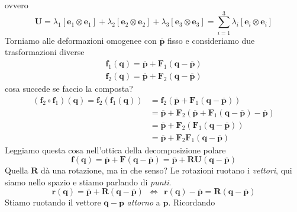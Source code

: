 \documentclass[10pt,a4paper,twoside]{book}
\begin{document}
ovvero
\begin{equation*}
\mathbf{U} =\lambda _{1}[\mathbf{e}_{1} \otimes \mathbf{e}_{1}] +\lambda _{2}[\mathbf{e}_{2} \otimes \mathbf{e}_{2}] +\lambda _{3}[\mathbf{e}_{3} \otimes \mathbf{e}_{3}] =\sum\limits ^{3}_{i=1} \lambda _{i}[\mathbf{e}_{i} \otimes \mathbf{e}_{i}]
\end{equation*}
Torniamo alle deformazioni omogenee con $\overline{\mathbf{p}}$ fisso e consideriamo due trasformazioni diverse
\begin{gather*}
\mathbf{f}_{1}(\mathbf{q}) =\overline{\mathbf{p}} +\mathbf{F}_{1}(\mathbf{q} -\overline{\mathbf{p}})\\
\mathbf{f}_{2}(\mathbf{q}) =\overline{\mathbf{p}} +\mathbf{F}_{2}(\mathbf{q} -\overline{\mathbf{p}})
\end{gather*}
cosa succede se faccio la composta?
\begin{equation*}
\begin{aligned}
(\mathbf{f}_{2} \circ \mathbf{f}_{1})(\mathbf{q}) =\mathbf{f}_{2}(\mathbf{f}_{1}(\mathbf{q})) & =\mathbf{f}_{2}(\overline{\mathbf{p}} +\mathbf{F}_{1}(\mathbf{q} -\overline{\mathbf{p}}))\\
 & =\overline{\mathbf{p}} +\mathbf{F}_{2}(\overline{\mathbf{p}} +\mathbf{F}_{1}(\mathbf{q} -\overline{\mathbf{p}}) -\overline{\mathbf{p}})\\
 & =\overline{\mathbf{p}} +\mathbf{F}_{2}(\mathbf{F}_{1}(\mathbf{q} -\overline{\mathbf{p}}))\\
 & =\overline{\mathbf{p}} +\mathbf{F}_{2}\mathbf{F}_{1}(\mathbf{q} -\overline{\mathbf{p}})
\end{aligned}
\end{equation*}
Leggiamo questa cosa nell'ottica della decomposizione polare
\begin{equation*}
\mathbf{f}(\mathbf{q}) =\overline{\mathbf{p}} +\mathbf{F}(\mathbf{q} -\overline{\mathbf{p}}) =\overline{\mathbf{p}} +\mathbf{RU}(\mathbf{q} -\overline{\mathbf{p}})
\end{equation*}
Quella $\mathbf{R}$ dà una rotazione, ma in che senso? Le rotazioni ruotano i \textit{vettori}, qui siamo nello spazio e stiamo parlando di \textit{punti}.
\begin{equation*}
\mathbf{r}(\mathbf{q}) =\overline{\mathbf{p}} +\mathbf{R}(\mathbf{q} -\overline{\mathbf{p}}) \ \ \Leftrightarrow \ \ \mathbf{r}(\mathbf{q}) -\overline{\mathbf{p}} =\mathbf{R}(\mathbf{q} -\overline{\mathbf{p}})
\end{equation*}
Stiamo ruotando il vettore $\mathbf{q} -\overline{\mathbf{p}}$ \textit{attorno} a $\overline{\mathbf{p}}$. Ricordando
\end{document}
